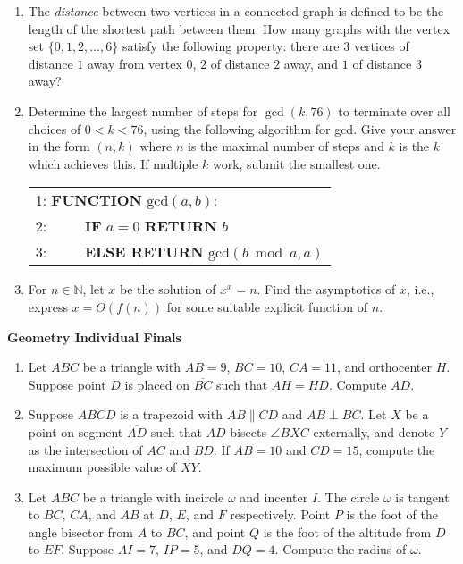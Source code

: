 \documentclass[10pt]{article}
\begin{document}
\begin{enumerate}

\item The \emph{distance} between two vertices in a connected graph is defined to be the length of the shortest path between them. How many graphs with the vertex set $\{0,1,2,\dots,6\}$ satisfy the following property: there are $3$ vertices of distance $1$ away from vertex $0$, $2$ of distance $2$ away, and $1$ of distance $3$ away?


\item Determine the largest number of steps for $\gcd(k,76)$ to terminate over all choices of $0 < k < 76$, using the following algorithm for gcd. Give your answer in the form $(n,k)$ where $n$ is the maximal number of steps and $k$ is the $k$ which achieves this. If multiple $k$ work, submit the smallest one.

\begin{tabular}{l}
1: \textbf{FUNCTION} $\text{gcd}(a,b)$: \\
2: $\qquad$ \textbf{IF} $a = 0$ \textbf{RETURN} $b$ \\ 
3: $\qquad$ \textbf{ELSE RETURN} $\text{gcd}(b \bmod a,a)$
\end{tabular}

\item For $n\in\mathbb N$, let $x$ be the solution of $x^x=n$. Find the asymptotics of $x$, i.e., express $x=\Theta(f(n))$ for some suitable explicit function of $n$.
\end{enumerate}

\newpage

\begin{center}
\huge\textbf{Geometry Individual Finals}
\end{center} \vspace{3pt}

\begin{enumerate}

\item Let $ABC$ be a triangle with $AB=9$, $BC=10$, $CA=11$, and orthocenter $H$.  Suppose point $D$ is placed on $\overline{BC}$ such that $AH=HD$.  Compute $AD$.

\item Suppose $ABCD$ is a trapezoid with $AB\parallel CD$ and $AB\perp BC$. Let $X$ be a point on segment $\overline{AD}$ such that $AD$ bisects $\angle BXC$ externally, and denote $Y$ as the intersection of $AC$ and $BD$. If $AB=10$ and $CD=15$, compute the maximum possible value of $XY$.

\item Let $ABC$ be a triangle with incircle $\omega$ and incenter $I$.  The circle $\omega$ is tangent to $BC$, $CA$, and $AB$ at $D$, $E$, and $F$ respectively.  Point $P$ is the foot of the angle bisector from $A$ to $BC$, and point $Q$ is the foot of the altitude from $D$ to $EF$. Suppose $AI=7$, $IP=5$, and $DQ=4$.  Compute the radius of $\omega$.
\end{enumerate}
\end{document}
